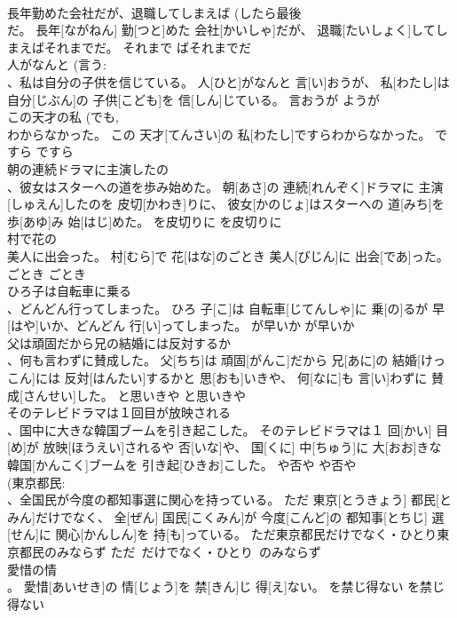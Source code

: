 \documentclass[8pt]{extreport}
\begin{document}
\begin{CJK}{UTF8}{min}
\\	長年勤めた会社だが、退職してしまえば (したら最後~ 
\\	だ。	長年[ながねん] 勤[つと]めた 会社[かいしゃ]だが、 退職[たいしょく]してしまえばそれまでだ。	それまで	ばそれまでだ	
\\	人がなんと (言う: 
\\	、私は自分の子供を信じている。	人[ひと]がなんと 言[い]おうが、 私[わたし]は 自分[じぶん]の 子供[こども]を 信[しん]じている。	言おうが	ようが	
\\	この天才の私 (でも, 
\\	わからなかった。	この 天才[てんさい]の 私[わたし]ですらわからなかった。	ですら	ですら	
\\	朝の連続ドラマに主演したの 
\\	、彼女はスターへの道を歩み始めた。	朝[あさ]の 連続[れんぞく]ドラマに 主演[しゅえん]したのを 皮切[かわき]りに、 彼女[かのじょ]はスターへの 道[みち]を 歩[あゆ]み 始[はじ]めた。	を皮切りに	を皮切りに	
\\	村で花の 
\\	美人に出会った。	村[むら]で 花[はな]のごとき 美人[びじん]に 出会[であ]った。	ごとき	ごとき	
\\	ひろ子は自転車に乗る 
\\	、どんどん行ってしまった。	ひろ 子[こ]は 自転車[じてんしゃ]に 乗[の]るが 早[はや]いか、どんどん 行[い]ってしまった。	が早いか	が早いか	
\\	父は頑固だから兄の結婚には反対するか 
\\	、何も言わずに賛成した。	父[ちち]は 頑固[がんこ]だから 兄[あに]の 結婚[けっこん]には 反対[はんたい]するかと 思[おも]いきや、 何[なに]も 言[い]わずに 賛成[さんせい]した。	と思いきや	と思いきや	
\\	そのテレビドラマは１回目が放映される 
\\	、国中に大きな韓国ブームを引き起こした。	そのテレビドラマは１ 回[かい] 目[め]が 放映[ほうえい]されるや 否[いな]や、 国[くに] 中[ちゅう]に 大[おお]きな 韓国[かんこく]ブームを 引き起[ひきお]こした。	や否や	や否や	
\\	(東京都民: 
\\	、全国民が今度の都知事選に関心を持っている。	ただ 東京[とうきょう] 都民[とみん]だけでなく、 全[ぜん] 国民[こくみん]が 今度[こんど]の 都知事[とちじ] 選[せん]に 関心[かんしん]を 持[も]っている。	ただ東京都民だけでなく・ひとり東京都民のみならず	ただ~だけでなく・ひとり~のみならず	
\\	愛惜の情 
\\	。	愛惜[あいせき]の 情[じょう]を 禁[きん]じ 得[え]ない。	を禁じ得ない	を禁じ得ない	

\end{CJK}
\end{document}
